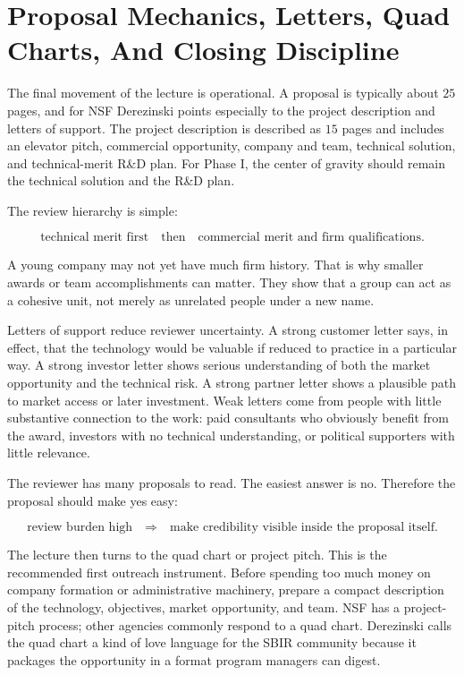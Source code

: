 \section{Proposal Mechanics, Letters, Quad Charts, And Closing Discipline}

The final movement of the lecture is operational. A proposal is typically about \(25\) pages, and for NSF Derezinski points especially to the project description and letters of support. The project description is described as \(15\) pages and includes an elevator pitch, commercial opportunity, company and team, technical solution, and technical-merit R\&D plan. For Phase I, the center of gravity should remain the technical solution and the R\&D plan.

The review hierarchy is simple:

\begin{equation}
\text{technical merit first}
\quad\text{then}\quad
\text{commercial merit and firm qualifications.}
\end{equation}

A young company may not yet have much firm history. That is why smaller awards or team accomplishments can matter. They show that a group can act as a cohesive unit, not merely as unrelated people under a new name.

Letters of support reduce reviewer uncertainty. A strong customer letter says, in effect, that the technology would be valuable if reduced to practice in a particular way. A strong investor letter shows serious understanding of both the market opportunity and the technical risk. A strong partner letter shows a plausible path to market access or later investment. Weak letters come from people with little substantive connection to the work: paid consultants who obviously benefit from the award, investors with no technical understanding, or political supporters with little relevance.

The reviewer has many proposals to read. The easiest answer is no. Therefore the proposal should make yes easy:

\begin{equation}
\text{review burden high}
\quad\Rightarrow\quad
\text{make credibility visible inside the proposal itself.}
\end{equation}

The lecture then turns to the quad chart or project pitch. This is the recommended first outreach instrument. Before spending too much money on company formation or administrative machinery, prepare a compact description of the technology, objectives, market opportunity, and team. NSF has a project-pitch process; other agencies commonly respond to a quad chart. Derezinski calls the quad chart a kind of love language for the SBIR community because it packages the opportunity in a format program managers can digest.


